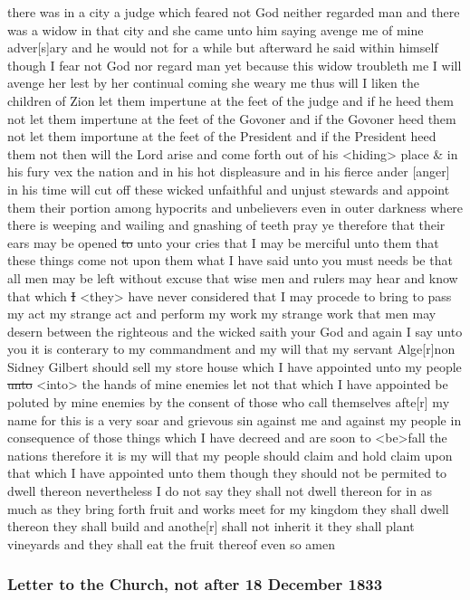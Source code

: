 there was in a city a judge which feared not God neither regarded man and there was a widow in that city and she came unto him saying avenge me of mine adver[s]ary and he would not for a while but afterward he said within himself though I fear not God nor regard man yet because this widow troubleth me I will avenge her lest by her continual coming she weary me thus will I liken the children of Zion let them impertune at the feet of the judge and if he heed them not let them impertune at the feet of the Govoner and if the Govoner heed them not let them importune at the feet of the President and if the President heed them not then will the Lord arise and come forth out of his <hiding> place \& in his fury vex the nation and in his hot displeasure and in his fierce ander [anger] in his time will cut off these wicked unfaithful and unjust stewards and appoint them their portion among hypocrits and unbelievers even in outer darkness where there is weeping and wailing and gnashing of teeth pray ye therefore that their ears may be opened \sout{to} unto your cries that I may be merciful unto them that these things come not upon them what I have said unto you must needs be that all men may be left without excuse that wise men and rulers may hear and know that which \sout{I} <they> have never considered that I may procede to bring to pass my act my strange act and perform my work my strange work that men may desern between the righteous and the wicked saith your God and again I say unto you it is conterary to my commandment and my will that my servant Alge[r]non Sidney Gilbert should sell my store house which I have appointed unto my people \sout{unto} <into> the hands of mine enemies let not that which I have appointed be poluted by mine enemies by the consent of those who call themselves afte[r] my name for this is a very soar and grievous sin against me and against my people in consequence of those things which I have decreed and are soon to <be>fall the nations therefore it is my will that my people should claim and hold claim upon that which I have appointed unto them though they should not be permited to dwell thereon nevertheless I do not say they shall not dwell thereon for in as much as they bring forth fruit and works meet for my kingdom they shall dwell thereon they shall build and anothe[r] shall not inherit it they shall plant vineyards and they shall eat the fruit thereof even so amen
				
		\subsubsection{Letter to the Church, not after 18 December 1833}
			\label{EMS-1833-JS-18-DEC-1833-BEFORE}
		
